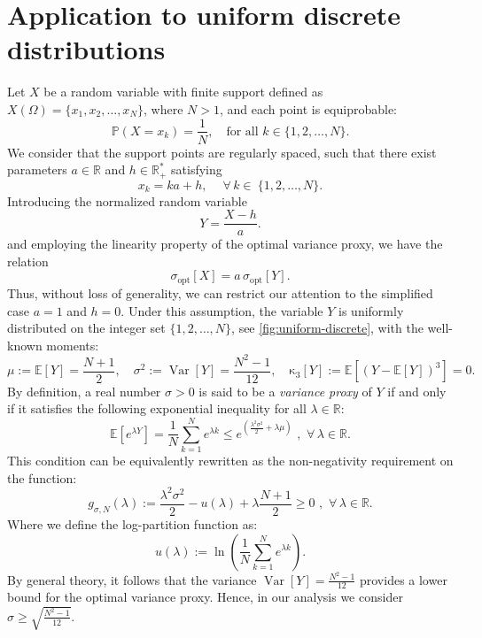 \documentclass[a4paper, 10pt]{article}
\newcommand{\E}{\mathbb{E}}
\newcommand{\beq}{\begin{equation}}
\newcommand{\eeq}{\end{equation}}
\theoremstyle{definition}
\begin{document}


\section{Application to uniform discrete distributions}\label{sec:uniform}
Let \( X \) be a random variable with finite support defined as \(X(\Omega)=\{x_1, x_2, \ldots, x_N\}\), where $N>1$, and each point is equiprobable: 
\[
  \mathbb{P}(X = x_k) = \frac{1}{N}, \quad \text{for all } k \in \{1,2,\dots,N\}.
\]
We consider that the support points are regularly spaced, such that there exist parameters \( a \in \mathbb{R} \) and  \( h \in  \mathbb{R}^{*}_{+} \) satisfying
 \[
 x_k = ka  + h , \quad \ \forall\, k  \in\ \{1,2,\dots,N\}.
 \]
Introducing the normalized random variable
 \[
 Y = \frac{X-h}{a}.
 \]
and employing the linearity property of the optimal variance proxy, we have the relation
\[
\sigma_{\mathrm{opt}}[X] = a\,\sigma_{\mathrm{opt}}[Y].
\]
Thus, without loss of generality, we can restrict our attention to the simplified case $a=1$ and $h=0$. Under this assumption, the variable $Y$ is uniformly distributed on the integer set $\{1, 2, \ldots, N\}$, see \autoref{fig:uniform-discrete}, with the well-known moments:
\beq
  \mu:=\E[Y]=\frac{N+1}{2}, \quad  \sigma^2:=\operatorname{Var}[Y]=\frac{N^2-1}{12}, \quad \operatorname{\kappa_3}[Y] := \E[(Y-\E[Y])^3]=0.
\eeq
By definition, a real number $\sigma>0$ is said to be a \emph{variance proxy} of $Y$  if and only if it satisfies the following exponential inequality for all $\lambda \in \mathbb{R}$:
\beq
\E\left[e^{\lambda Y}\right]=  \frac{1}{N}\sum_{k=1}^{N} e^{\lambda k} \leq e^{\left(\frac{\lambda^2\sigma^2}{2}+\lambda \mu\right)} \,\, ,\,\, \forall \, \lambda\in \mathbb{R}.
\eeq
This condition can be equivalently rewritten as the non-negativity requirement on the function:
\beq
g_{\sigma,N}(\lambda):=\frac{\lambda^2\sigma^2}{2}-u(\lambda)+\lambda \frac{N+1}{2} \geq 0 \,\,,\,\,  \forall \, \lambda\in \mathbb{R}.
\eeq
Where we define the log-partition function as:
\[
u(\lambda) := \ln\left(\frac{1}{N}\sum_{k=1}^{N} e^{\lambda k}\right).
\]
By general theory, it follows that the variance $\operatorname{Var}[Y]=\frac{N^2-1}{12}$ provides a lower bound for the optimal variance proxy. Hence, in our analysis we consider $\sigma\geq \sqrt{\frac{N^2-1}{12}}$.\\
\end{document}
